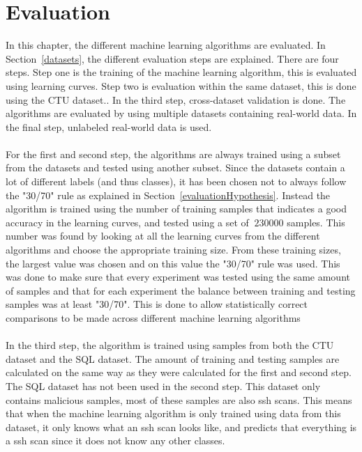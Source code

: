 
\chapter{Evaluation} %

\label{evaluation} %

In this chapter, the different machine learning algorithms are evaluated. In Section~\ref{datasets}, the different evaluation steps are explained. There are four steps. Step one is the training of the machine learning algorithm, this is evaluated using learning curves. Step two is evaluation within the same dataset, this is done using the CTU dataset.. In the third step, cross-dataset validation is done. The algorithms are evaluated by using multiple datasets containing real-world data. In the final step, unlabeled real-world data is used. \\
\\
For the first and second step, the algorithms are always trained using a subset from the datasets and tested using another subset. Since the datasets contain a lot of different labels (and thus classes), it has been chosen not to always follow the "30/70" rule as explained in Section~\ref{evaluationHypothesis}. Instead the algorithm is trained using the number of training samples that indicates a good accuracy in the learning curves, and tested using a set of $~230000$ samples. This number was found by looking at all the learning curves from the different algorithms and choose the appropriate training size. From these training sizes, the largest value was chosen and on this value the "30/70" rule was used. This was done to make sure that every experiment was tested using the same amount of samples and that for each experiment the balance between training and testing samples was at least "30/70". This is done to allow statistically correct comparisons to be made across different machine learning algorithms \\
\\
In the third step, the algorithm is trained using samples from both the CTU dataset and the SQL dataset. The amount of training and testing samples are calculated on the same way as they were calculated for the first and second step. The SQL dataset has not been used in the second step. This dataset only contains malicious samples, most of these samples are also ssh scans. This means that when the machine learning algorithm is only trained using data from this dataset, it only knows what an ssh scan looks like, and predicts that everything is a ssh scan since it does not know any other classes. \\
